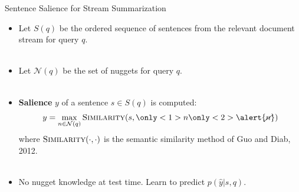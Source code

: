 \begin{frame}{Sentence Salience for Stream Summarization} 
 \begin{itemize}
    \item Let $S(q)$ be the ordered sequence of sentences from the relevant 
        document stream for query $q$. ~\\~\\
   \item Let $\mathcal{N}(q)$ be the set of nuggets for query $q$. ~\\~\\
   \item \textbf{Salience} $y$ of a sentence $s\in S(q)$ is computed:  \[y = \max_{n \in \mathcal{N}(q)} 
       \textsc{Similarity}(s,\only<1>{n}\only<2>{\alert{\cancel{n}}})\]  where $\textsc{Similarity}(\cdot, \cdot)$
      is the semantic similarity method of Guo and Diab, 2012.~\\~\\
\item<2>{\alert{No nugget knowledge at test time. Learn to predict $p(\hat{y}|s,q)$. }}
    \end{itemize}
\end{frame}

